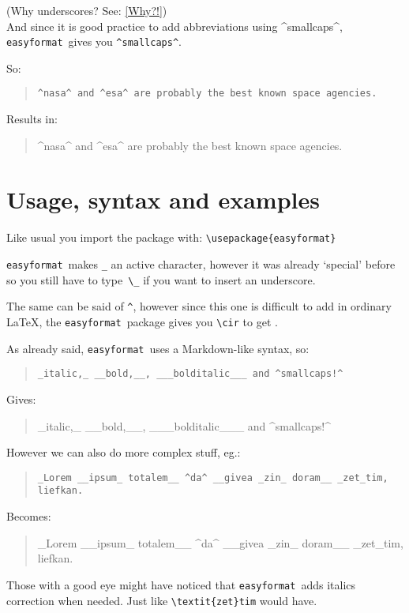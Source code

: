 \documentclass[a4paper, 11pt]{article}
\def\easyformat{\texttt{easyformat}}
\begin{document}
	(Why underscores? See: \ref{Why?!})\\
	
	And since it is good practice to add abbreviations using ^smallcaps^, \easyformat\ gives you \verb|^smallcaps^|.
	
	So:
	\begin{quote}
		\verb|^nasa^ and ^esa^ are probably the best known space agencies.|
	\end{quote}

	Results in:
	\begin{quote}
		^nasa^ and ^esa^ are probably the best known space agencies.
	\end{quote}
	
	\section{Usage, syntax and examples}
	Like usual you import the package with: \verb|\usepackage{easyformat}|

	\easyformat\ makes \verb|_| an active character, however it was already `special' before so you still have to type~\verb|\_| if you want to insert an underscore.
	
	The same can be said of \verb|^|, however since this one is difficult to add in ordinary \LaTeX, the \easyformat\ package gives you \verb|\cir| to get \cir.
	
	\newpage

	As already said, \easyformat\ uses a Markdown-like syntax, so:
	
	\begin{quote}
		\verb|_italic,_ __bold,__, ___bolditalic___ and ^smallcaps!^|
	\end{quote}

	Gives:
	\begin{quote}
		_italic,_ __bold,__, ___bolditalic___ and ^smallcaps!^
	\end{quote}

	However we can also do more complex stuff, eg.:
	\begin{quote}
		\verb|_Lorem __ipsum_ totalem__ ^da^ __givea _zin_ doram__ _zet_tim, liefkan.|
	\end{quote}
	
	Becomes:
	\begin{quote}
		_Lorem __ipsum_ totalem__ ^da^ __givea _zin_ doram__ _zet_tim, liefkan.
	\end{quote}

	Those with a good eye might have noticed that \easyformat\ adds italics correction when needed. Just like \verb|\textit{zet}tim| would have.
	
\end{document}

